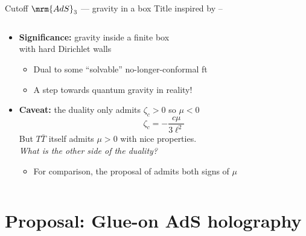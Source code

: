 \documentclass[
	10pt
	,noamsthm
]{beamer}
\newcommand{\TTbar}{\texorpdfstring{\ensuremath{T\bar{T}}}{TTbar}\xspace}
\begin{document}
\begin{frame}{Cutoff $\mrm{AdS}_3$ --- gravity in a box}{%
	Title inspired by
	\textcite{Kraus:2021cwf} -- %
}
\begin{columns}
\figCutoffAds
\hspace{-1.2em}
\begin{column}{.75\textwidth}
\vspace{-.5\baselineskip}
	\begin{itemize}
	\item \textbf{Significance:} gravity inside a finite box\\
		with hard Dirichlet walls
	
	\begin{itemize}
		\item Dual to some ``solvable'' no-longer-conformal ft
		\item A step towards quantum gravity in reality!
	\end{itemize}
	
\pause
	\item \textbf{Caveat:} the duality only admits $\zeta_c > 0$ so $\mu < 0$
	\begin{equation}
		\zeta_c = - \frac{c \mu}{3\ell^2}
	\end{equation}
	But \TTbar itself admits $\mu > 0$ with nice properties.\\
	\textit{What is the other side of the duality?}
		\begin{itemize}
		\item For comparison, the proposal of \textcite{Guica:2019nzm} admits both signs of $\mu$
		\end{itemize}
	\end{itemize}
\end{column}
\end{columns}
\end{frame}

\section{\textbf{Proposal:} Glue-on AdS holography} \label{se:glueonproposal}
\end{document}

